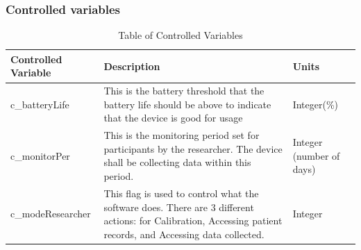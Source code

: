 \documentclass[12pt]{article}
\begin{document}
\subsubsection{Controlled variables}
\begin{table}
\begin{tabular}{ |m{10em}|m{25em}|m{5em}| }
  \hline
  \rowcolor{LightCyan}
  \textbf{Controlled Variable} & \textbf{Description}                                                                                                          & \textbf{Units}           \\
  \hline
  \label{cBat}c\_batteryLife & This is the battery threshold that the battery life should be above to indicate that the device is good for usage             & Integer(\%)              \\
  \hline
  \label{cMon}c\_monitorPer  & This is the monitoring period set for participants by the researcher. The device shall be collecting data within this period. & Integer (number of days) \\
  \hline
  \label{cMod}c\_modeResearcher   & This flag is used to control what the software does. There are 3 different actions: for Calibration, Accessing patient records, and Accessing data collected. & Integer                  \\
  \hline
\end{tabular}
\caption{\label{conVar}Table of Controlled Variables}  
\end{table}
\end{document}
